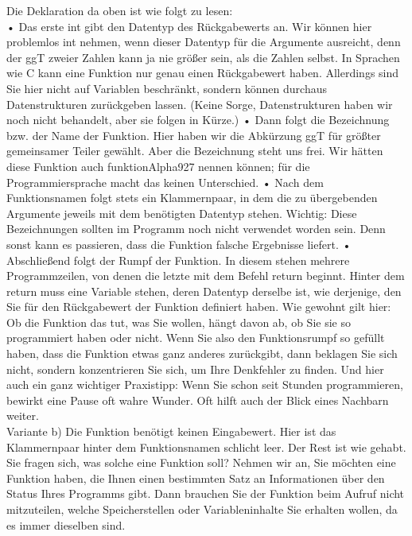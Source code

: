 Die Deklaration da oben ist wie folgt zu lesen:\\

•	Das erste int gibt den Datentyp des Rückgabewerts an. Wir können hier problemlos int nehmen, wenn dieser Datentyp für die Argumente ausreicht, denn der ggT zweier Zahlen kann ja nie größer sein, als die Zahlen selbst. In Sprachen wie C kann eine Funktion nur genau einen Rückgabewert haben. Allerdings sind Sie hier nicht auf Variablen beschränkt, sondern können durchaus Datenstrukturen zurückgeben lassen. (Keine Sorge, Datenstrukturen haben wir noch nicht behandelt, aber sie folgen in Kürze.)
•	Dann folgt die Bezeichnung  bzw. der Name der Funktion. Hier haben wir die Abkürzung ggT für größter gemeinsamer Teiler gewählt. Aber die Bezeichnung steht uns frei. Wir hätten diese Funktion auch funktionAlpha927 nennen können; für die Programmiersprache macht das keinen Unterschied.
•	Nach dem Funktionsnamen folgt stets ein Klammernpaar, in dem die zu übergebenden Argumente jeweils mit dem benötigten Datentyp stehen. Wichtig: Diese Bezeichnungen sollten im Programm noch nicht verwendet worden sein. Denn sonst kann es passieren, dass die Funktion falsche Ergebnisse liefert.
•	Abschließend folgt der Rumpf der Funktion. In diesem stehen mehrere Programmzeilen, von denen die letzte mit dem \glqq{}Befehl\grqq{} return beginnt. Hinter dem return muss eine Variable stehen, deren Datentyp derselbe ist, wie derjenige, den Sie für den Rückgabewert der Funktion definiert haben. Wie gewohnt gilt hier: Ob die Funktion das tut, was Sie wollen, hängt davon ab, ob Sie sie so programmiert haben oder nicht. Wenn Sie also den Funktionsrumpf so gefüllt haben, dass die Funktion etwas ganz anderes zurückgibt, dann beklagen Sie sich nicht, sondern konzentrieren Sie sich, um Ihre Denkfehler zu finden. Und hier auch ein ganz wichtiger Praxistipp: Wenn Sie schon seit Stunden programmieren, bewirkt eine Pause oft wahre Wunder. Oft hilft auch der Blick eines Nachbarn weiter.\\

Variante b) Die Funktion benötigt keinen Eingabewert. Hier ist das Klammernpaar hinter dem Funktionsnamen schlicht leer. Der Rest ist wie gehabt. Sie fragen sich, was solche eine Funktion soll? Nehmen wir an, Sie möchten eine Funktion haben, die Ihnen einen bestimmten Satz an Informationen über den Status Ihres Programms gibt. Dann brauchen Sie der Funktion beim Aufruf nicht mitzuteilen, welche Speicherstellen oder Variableninhalte Sie erhalten wollen, da es immer dieselben sind.\\

